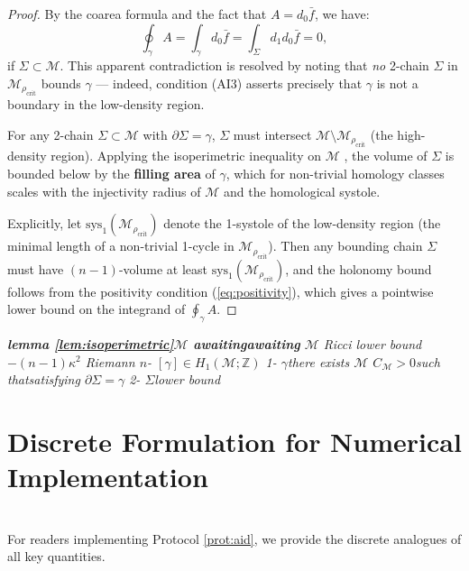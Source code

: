 \documentclass[11pt,a4paper]{article}
\theoremstyle{plain}
\theoremstyle{definition}
\newcommand{\Z}{\mathbb{Z}}
\newcommand{\cM}{\mathcal{M}}
\begin{document}
\begin{proof}
By the coarea formula and the fact that $A = d_0 \bar{f}$, we have:
\begin{equation}
  \oint_{\gamma} A = \int_{\gamma} d_0 \bar{f} = \int_{\Sigma} d_1 d_0 \bar{f} = 0,
  \label{eq:coarea_attempt}
\end{equation}
if $\Sigma \subset \cM$. This apparent contradiction is resolved by noting 
that \emph{no} 2-chain $\Sigma$ in $\cM_{\rho_{\text{crit}}}$ bounds 
$\gamma$ — indeed, condition (AI3) asserts precisely that $\gamma$ is not 
a boundary in the low-density region.

For any 2-chain $\Sigma \subset \cM$ with $\partial \Sigma = \gamma$, 
$\Sigma$ must intersect $\cM \setminus \cM_{\rho_{\text{crit}}}$ (the 
high-density region). Applying the isoperimetric inequality on $\cM$ 
\cite{chavel2001}, the volume of $\Sigma$ is bounded below by the 
\textbf{filling area} of $\gamma$, which for non-trivial homology 
classes scales with the injectivity radius of $\cM$ and the homological 
systole.

Explicitly, let $\text{sys}_1(\cM_{\rho_{\text{crit}}})$ denote the 
1-systole of the low-density region (the minimal length of a non-trivial 
1-cycle in $\cM_{\rho_{\text{crit}}}$). Then any bounding chain $\Sigma$ 
must have $(n-1)$-volume at least $\text{sys}_1(\cM_{\rho_{\text{crit}}})$, 
and the holonomy bound follows from the positivity condition 
(\ref{eq:positivity}), which gives a pointwise lower bound on the 
integrand of $\oint_{\gamma} A$.
\end{proof}

\bigskip
\noindent
\textit{\textbf{lemma \ref{lem:isoperimetric}$\cM$ awaitingawaiting} $\cM$  Ricci lower bound $-(n-1)\kappa^2$  Riemann $n$- $[\gamma] \in H_1(\cM; \Z)$ 1- $\gamma$there exists $\cM$  $C_{\cM} > 0$such thatsatisfying $\partial \Sigma = \gamma$ 2- $\Sigma$lower bound}

\section{Discrete Formulation for Numerical Implementation}
\section*{}

For readers implementing Protocol \ref{prot:aid}, we provide the discrete 
analogues of all key quantities.
\end{document}
